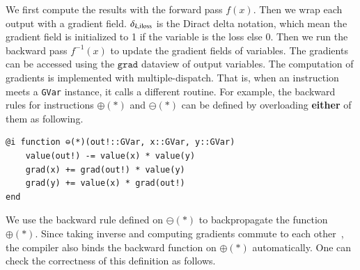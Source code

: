 \documentclass{article}
\newcommand{\<}{\langle}
\renewcommand{\>}{\rangle}
\newcommand{\vx}{{\mathbf{x}}}
\newcommand{\vy}{{\mathbf{y}}}
\newcommand{\vvalue}{{\texttt{value}}}
\newcommand{\grad}{{\texttt{grad}}}
\theoremstyle{definition}\newtheorem{definition}{\textit{Definition}}
\begin{document}
We first compute the results with the forward pass $f(x)$.
Then we wrap each output with a gradient field. $\delta_{k, \rm iloss}$ is the Diract delta notation, which mean the gradient field is initialized to 1 if the variable is the loss else 0. Then we run the backward pass $f^{-1}(x)$ to update the gradient fields of variables.
The gradients can be accessed using the $\grad$ dataview of output variables.
The computation of gradients is implemented with multiple-dispatch. That is, when an instruction meets a \texttt{GVar} instance, it calls a different routine. For example, the backward rules for instructions \texttt{$\oplus(*)$} and \texttt{$\ominus(*)$} can be defined by overloading \textbf{either} of them as following.

\begin{minipage}{.88\columnwidth}
\begin{lstlisting}[mathescape=true]
@i function ⊖(*)(out!::GVar, x::GVar, y::GVar)
    value(out!) -= value(x) * value(y)
    grad(x) += grad(out!) * value(y)
    grad(y) += value(x) * grad(out!)
end
\end{lstlisting}
\end{minipage}

We use the backward rule defined on $\ominus(*)$ to backpropagate the function $\oplus(*)$.
Since taking inverse and computing gradients commute to each other~\cite{Mcinerney2015}, the compiler also binds the backward function on $\oplus(*)$ automatically.
One can check the correctness of this definition as follows.
\end{document}
